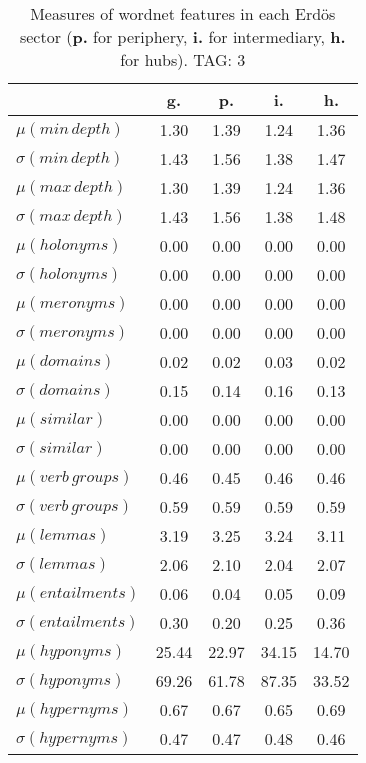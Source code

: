 \begin{table}[h!]
\begin{center}
\begin{tabular}{| l || c | c | c | c |}\hline
 & {\bf g.} & {\bf p.} & {\bf i.} & {\bf h.} \\\hline\hline
$\mu(min\,depth)$ & 1.30  & 1.39  & 1.24  & 1.36 \\
$\sigma(min\,depth)$ & 1.43  & 1.56  & 1.38  & 1.47 \\\hline
$\mu(max\,depth)$ & 1.30  & 1.39  & 1.24  & 1.36 \\
$\sigma(max\,depth)$ & 1.43  & 1.56  & 1.38  & 1.48 \\\hline
$\mu(holonyms)$ & 0.00  & 0.00  & 0.00  & 0.00 \\
$\sigma(holonyms)$ & 0.00  & 0.00  & 0.00  & 0.00 \\\hline
$\mu(meronyms)$ & 0.00  & 0.00  & 0.00  & 0.00 \\
$\sigma(meronyms)$ & 0.00  & 0.00  & 0.00  & 0.00 \\\hline
$\mu(domains)$ & 0.02  & 0.02  & 0.03  & 0.02 \\
$\sigma(domains)$ & 0.15  & 0.14  & 0.16  & 0.13 \\\hline
$\mu(similar)$ & 0.00  & 0.00  & 0.00  & 0.00 \\
$\sigma(similar)$ & 0.00  & 0.00  & 0.00  & 0.00 \\\hline
$\mu(verb\,groups)$ & 0.46  & 0.45  & 0.46  & 0.46 \\
$\sigma(verb\,groups)$ & 0.59  & 0.59  & 0.59  & 0.59 \\\hline
$\mu(lemmas)$ & 3.19  & 3.25  & 3.24  & 3.11 \\
$\sigma(lemmas)$ & 2.06  & 2.10  & 2.04  & 2.07 \\\hline
$\mu(entailments)$ & 0.06  & 0.04  & 0.05  & 0.09 \\
$\sigma(entailments)$ & 0.30  & 0.20  & 0.25  & 0.36 \\\hline
$\mu(hyponyms)$ & 25.44  & 22.97  & 34.15  & 14.70 \\
$\sigma(hyponyms)$ & 69.26  & 61.78  & 87.35  & 33.52 \\\hline
$\mu(hypernyms)$ & 0.67  & 0.67  & 0.65  & 0.69 \\
$\sigma(hypernyms)$ & 0.47  & 0.47  & 0.48  & 0.46 \\\hline
\end{tabular}
\caption{Measures of wordnet features in each Erd\"os sector ({{\bf p.}} for periphery, {{\bf i.}} for intermediary, {{\bf h.}} for hubs). TAG: 3}
\end{center}
\end{table}